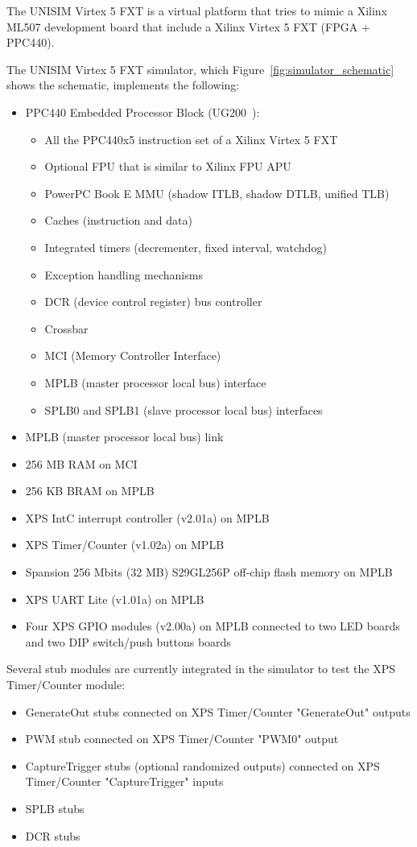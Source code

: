 The UNISIM Virtex 5 FXT is a virtual platform that tries to mimic a Xilinx ML507 development board that include a Xilinx Virtex 5 FXT (FPGA + PPC440).

\noindent The UNISIM Virtex 5 FXT simulator, which Figure~\ref{fig:simulator_schematic} shows the schematic, implements the following:
\begin{itemize}
	\item PPC440 Embedded Processor Block (UG200~\cite{UG200}):
		\begin{itemize}
			\item All the PPC440x5 \cite{PPC440x5} instruction set of a Xilinx Virtex 5 FXT
			\item Optional FPU that is similar to Xilinx FPU APU \cite{APU_FPU}
			\item PowerPC Book E MMU (shadow ITLB, shadow DTLB, unified TLB)
			\item Caches (instruction and data)
			\item Integrated timers (decrementer, fixed interval, watchdog)
			\item Exception handling mechanisms
			\item DCR (device control register) bus controller
			\item Crossbar
			\item MCI (Memory Controller Interface)
			\item MPLB (master processor local bus) interface
			\item SPLB0 and SPLB1 (slave processor local bus) interfaces
		\end{itemize}
	\item MPLB (master processor local bus) link
	\item 256 MB RAM on MCI
	\item 256 KB BRAM on MPLB
	\item XPS IntC interrupt controller (v2.01a) \cite{XPS_INTC} on MPLB
	\item XPS Timer/Counter (v1.02a) \cite{XPS_TIMER_COUNTER} on MPLB
	\item Spansion 256 Mbits (32 MB) S29GL256P off-chip flash memory \cite{S29GLP} on MPLB
	\item XPS UART Lite (v1.01a) \cite{XPS_UART_LITE} on MPLB
	\item Four XPS GPIO modules (v2.00a) \cite{XPS_GPIO} on MPLB connected to two LED boards and two DIP switch/push buttons boards
\end{itemize}

\noindent Several stub modules are currently integrated in the simulator to test the XPS Timer/Counter module:
\begin{itemize}
\item GenerateOut stubs connected on XPS Timer/Counter "GenerateOut" outputs
\item PWM stub connected on XPS Timer/Counter "PWM0" output
\item CaptureTrigger stubs (optional randomized outputs) connected on XPS Timer/Counter "CaptureTrigger" inputs
\item SPLB stubs
\item DCR stubs
\end{itemize}

